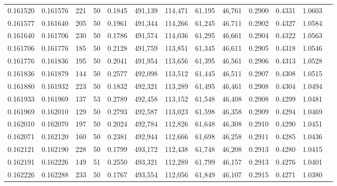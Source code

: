 \begin{tabular}{rrrrrrrrrrrrr}
0.161520 & 0.161576 &   221 &  50 &                                     0.1845 & 491,139 & 114,471 &  61,195 &  46,761 & 0.2900 & 0.4331 & 1.0603 \\
0.161577 & 0.161640 &   205 &  50 &                                     0.1961 & 491,344 & 114,266 &  61,245 &  46,711 & 0.2902 & 0.4327 & 1.0584 \\
0.161640 & 0.161706 &   230 &  50 &                                     0.1786 & 491,574 & 114,036 &  61,295 &  46,661 & 0.2904 & 0.4322 & 1.0563 \\
0.161706 & 0.161776 &   185 &  50 &                                     0.2128 & 491,759 & 113,851 &  61,345 &  46,611 & 0.2905 & 0.4318 & 1.0546 \\
0.161776 & 0.161836 &   195 &  50 &                                     0.2041 & 491,954 & 113,656 &  61,395 &  46,561 & 0.2906 & 0.4313 & 1.0528 \\
0.161836 & 0.161879 &   144 &  50 &                                     0.2577 & 492,098 & 113,512 &  61,445 &  46,511 & 0.2907 & 0.4308 & 1.0515 \\
0.161880 & 0.161932 &   223 &  50 &                                     0.1832 & 492,321 & 113,289 &  61,495 &  46,461 & 0.2908 & 0.4304 & 1.0494 \\
0.161933 & 0.161969 &   137 &  53 &                                     0.2789 & 492,458 & 113,152 &  61,548 &  46,408 & 0.2908 & 0.4299 & 1.0481 \\
0.161969 & 0.162010 &   129 &  50 &                                     0.2793 & 492,587 & 113,023 &  61,598 &  46,358 & 0.2909 & 0.4294 & 1.0469 \\
0.162010 & 0.162070 &   197 &  50 &                                     0.2024 & 492,784 & 112,826 &  61,648 &  46,308 & 0.2910 & 0.4290 & 1.0451 \\
0.162071 & 0.162120 &   160 &  50 &                                     0.2381 & 492,944 & 112,666 &  61,698 &  46,258 & 0.2911 & 0.4285 & 1.0436 \\
0.162121 & 0.162190 &   228 &  50 &                                     0.1799 & 493,172 & 112,438 &  61,748 &  46,208 & 0.2913 & 0.4280 & 1.0415 \\
0.162191 & 0.162226 &   149 &  51 &                                     0.2550 & 493,321 & 112,289 &  61,799 &  46,157 & 0.2913 & 0.4276 & 1.0401 \\
0.162226 & 0.162288 &   233 &  50 &                                     0.1767 & 493,554 & 112,056 &  61,849 &  46,107 & 0.2915 & 0.4271 & 1.0380 \\

\end{tabular}

